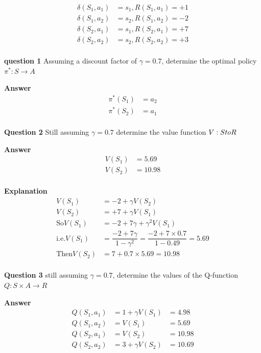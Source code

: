 \documentclass[11pt]{article}
\begin{document}
\[
\begin{aligned}
    \delta (S_1, a_1) &= s_1, R(S_1, a_1) = +1 \\
    \delta (S_1, a_2) &= s_2, R(S_1, a_2) = -2 \\
    \delta (S_2, a_1) &= s_1, R(S_2, a_1) = +7 \\
    \delta (S_2, a_2) &= s_2, R(S_2, a_2) = +3 \\
\end{aligned}
\]

\textbf{question 1}
Assuming a discount factor of $\gamma = 0.7$, determine the optimal policy
$\pi^* : S \to A$

\textbf{Answer}
\[
\begin{aligned}
\pi^* (S_1) &= a_2 \\
\pi^* (S_2) &= a_1 \\
\end{aligned}
\]

\textbf{Question 2}
Still assuming $\gamma = 0.7$ determine the value function $V: S \\to R$

\textbf{Answer}
\[
\begin{aligned}
    V(S_1) &= 5.69 \\
    V(S_2) &= 10.98 \\
\end{aligned}
\]

\textbf{Explanation}
\[
\begin{aligned}
V(S_1) &= -2 + \gamma V(S_2) \\
V(S_2) &= +7 + \gamma V(S_1) \\
\text{So} V(S_1) &= -2 + 7 \gamma + \gamma^2 V(S_1) \\
\text{i.e.} V(S_1) &= \dfrac{-2 + 7\gamma}{1 - \gamma^2} = \dfrac{-2 + 7 \times 0.7}{1 - 0.49} = 5.69 \\
\text{Then} V(S_2) &= 7 + 0.7 \times 5.69 = 10.98\\
\end{aligned}
\]

\textbf{Question 3}
still assuming $\gamma = 0.7$, determine the values of the Q-function
$Q: S \times A \to R$

\textbf{Answer}
\[
\begin{aligned}
Q(S_1, a_1) &= 1 + \gamma V (S_1) &= 4.98 \\
Q(S_1, a_2) &= V(S_1) &= 5.69 \\
Q(S_2, a_1) &= V(S_2) &= 10.98 \\
Q(S_2, a_2) &= 3 + \gamma V(S_2) &= 10.69 \\
\end{aligned}
\]
\end{document}
